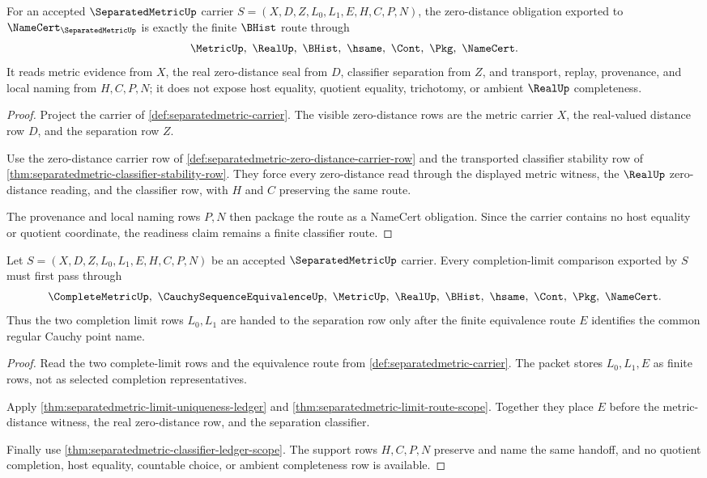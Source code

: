 \begin{theorem}
\label{thm:separatedmetric-zero-distance-namecert-readiness}
For an accepted $\SeparatedMetricUp$ carrier $S=(X,D,Z,L_0,L_1,E,H,C,P,N)$, the zero-distance obligation exported to $\NameCert_{\SeparatedMetricUp}$ is exactly the finite $\BHist$ route through
$$
\MetricUp,\ \RealUp,\ \BHist,\ \hsame,\ \Cont,\ \Pkg,\ \NameCert .
$$
It reads metric evidence from $X$, the real zero-distance seal from $D$, classifier separation from $Z$, and transport, replay, provenance, and local naming from $H,C,P,N$; it does not expose host equality, quotient equality, trichotomy, or ambient $\RealUp$ completeness.
\end{theorem}
\begin{proof}
Project the carrier of \autoref{def:separatedmetric-carrier}. The visible zero-distance rows are the metric carrier $X$, the real-valued distance row $D$, and the separation row $Z$.

Use the zero-distance carrier row of \autoref{def:separatedmetric-zero-distance-carrier-row} and the transported classifier stability row of \autoref{thm:separatedmetric-classifier-stability-row}. They force every zero-distance read through the displayed metric witness, the $\RealUp$ zero-distance reading, and the classifier row, with $H$ and $C$ preserving the same route.

The provenance and local naming rows $P,N$ then package the route as a NameCert obligation. Since the carrier contains no host equality or quotient coordinate, the readiness claim remains a finite classifier route.
\end{proof}

\begin{theorem}
\label{thm:separatedmetric-completion-limit-equivalence-handoff}
Let $S=(X,D,Z,L_0,L_1,E,H,C,P,N)$ be an accepted $\SeparatedMetricUp$ carrier. Every completion-limit comparison exported by $S$ must first pass through
$$
\CompleteMetricUp,\ \CauchySequenceEquivalenceUp,\ \MetricUp,\ \RealUp,\ \BHist,\ \hsame,\ \Cont,\ \Pkg,\ \NameCert .
$$
Thus the two completion limit rows $L_0,L_1$ are handed to the separation row only after the finite equivalence route $E$ identifies the common regular Cauchy point name.
\end{theorem}
\begin{proof}
Read the two complete-limit rows and the equivalence route from \autoref{def:separatedmetric-carrier}. The packet stores $L_0,L_1,E$ as finite rows, not as selected completion representatives.

Apply \autoref{thm:separatedmetric-limit-uniqueness-ledger} and \autoref{thm:separatedmetric-limit-route-scope}. Together they place $E$ before the metric-distance witness, the real zero-distance row, and the separation classifier.

Finally use \autoref{thm:separatedmetric-classifier-ledger-scope}. The support rows $H,C,P,N$ preserve and name the same handoff, and no quotient completion, host equality, countable choice, or ambient completeness row is available.
\end{proof}

